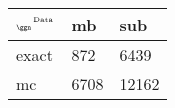 \begin{tabular}{lll}
    \toprule
    $_{\text{\tiny{\ggn}}}$$^{\text{\tiny{Data}}}$ & mb & sub \\
    \midrule
    exact & 872
              & 6439 \\
    mc   & 6708
              & 12162 \\
    \bottomrule
\end{tabular}